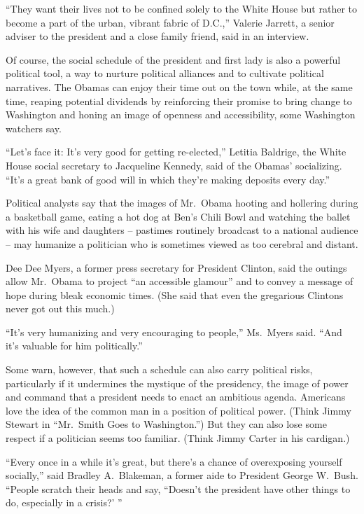 \documentclass[12pt,a4paper,onecolumn]{article}
\begin{document}
\begin{CJK*}{GBK}{song}
``They want their lives not to be confined solely to the White House but rather to become a part of
the urban, vibrant fabric of D.C.,'' Valerie Jarrett, a senior adviser to the president and a close
family friend, said in an interview.

Of course, the social schedule of the president and first lady is also a powerful political tool, a
way to nurture political alliances and to cultivate political narratives. The Obamas can enjoy their
time out on the town while, at the same time, reaping potential dividends by reinforcing their
promise to bring change to Washington and honing an image of openness and accessibility, some
Washington watchers say.

``Let's face it: It's very good for getting re-elected,'' Letitia Baldrige, the White House social
secretary to Jacqueline Kennedy, said of the Obamas' socializing. ``It's a great bank of good will
in which they're making deposits every day.''

Political analysts say that the images of Mr.~Obama hooting and hollering during a basketball game,
eating a hot dog at Ben's Chili Bowl and watching the ballet with his wife and daughters -- pastimes
routinely broadcast to a national audience -- may humanize a politician who is sometimes viewed as
too cerebral and distant.

Dee Dee Myers, a former press secretary for President Clinton, said the outings allow Mr.~Obama to
project ``an accessible glamour'' and to convey a message of hope during bleak economic times. (She
said that even the gregarious Clintons never got out this much.)

``It's very humanizing and very encouraging to people,'' Ms.~Myers said. ``And it's valuable for him
politically.''

Some warn, however, that such a schedule can also carry political risks, particularly if it
undermines the mystique of the presidency, the image of power and command that a president needs to
enact an ambitious agenda. Americans love the idea of the common man in a position of political
power. (Think Jimmy Stewart in ``Mr.~Smith Goes to Washington.'') But they can also lose some
respect if a politician seems too familiar. (Think Jimmy Carter in his cardigan.)

``Every once in a while it's great, but there's a chance of overexposing yourself socially,'' said
Bradley A.~Blakeman, a former aide to President George W.~Bush. ``People scratch their heads and
say, ``Doesn't the president have other things to do, especially in a crisis?' ''


\end{CJK*}
\end{document}
